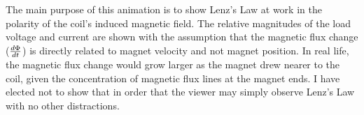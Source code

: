 





The main purpose of this animation is to show Lenz's Law at work in the polarity of the coil's induced magnetic field.  The relative magnitudes of the load voltage and current are shown with the assumption that the magnetic flux change ($d\Phi \over dt$) is directly related to magnet velocity and not magnet position.  In real life, the magnetic flux change would grow larger as the magnet drew nearer to the coil, given the concentration of magnetic flux lines at the magnet ends.  I have elected not to show that in order that the viewer may simply observe Lenz's Law with no other distractions.




